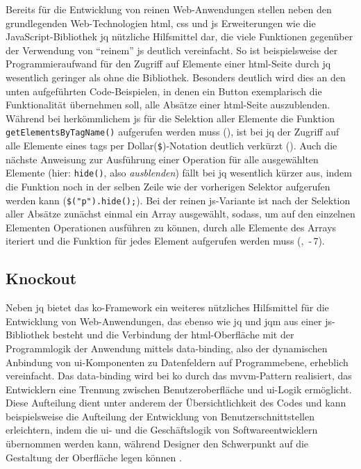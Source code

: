 Bereits für die Entwicklung von reinen Web-Anwendungen stellen neben den grundlegenden Web-Technologien \gls{html}, \gls{css} und \gls{js} Erweiterungen wie die JavaScript-Bibliothek \gls{jq} nützliche Hilfsmittel dar, die viele Funktionen gegenüber der Verwendung von \enquote{reinem} \gls{js} deutlich vereinfacht.
So ist beispielsweise der Programmieraufwand für den Zugriff auf Elemente einer \gls{html}-Seite durch \gls{jq} wesentlich geringer als ohne die Bibliothek.
Besonders deutlich wird dies an den unten aufgeführten Code-Beispielen, in denen ein Button exemplarisch die Funktionalität übernehmen soll, alle Absätze einer \gls{html}-Seite auszublenden.
Während bei herkömmlichem \gls{js} für die Selektion aller Elemente die Funktion \lstinline|getElementsByTagName()| aufgerufen werden muss (), ist bei \gls{jq} der Zugriff auf alle Elemente eines \glspl{tag} per Dollar(\lstinline|$|)-Notation deutlich verkürzt ().
Auch die nächste Anweisung zur Ausführung einer Operation für alle ausgewählten Elemente (hier: \lstinline|hide()|, also \textit{ausblenden}) fällt bei \gls{jq} wesentlich kürzer aus, indem die Funktion noch in der selben Zeile wie der vorherigen Selektor aufgerufen werden kann (\lstinline|$("p").hide();|).
Bei der reinen \gls{js}-Variante ist nach der Selektion aller Absätze zunächst einmal ein Array ausgewählt, sodass, um auf den einzelnen Elementen Operationen ausführen zu können, durch alle Elemente des Arrays iteriert und die Funktion für jedes Element aufgerufen werden muss (, \,-\,7).


	
\subsection{Knockout}  \label{ko}

Neben \gls{jq} bietet das \gls{ko}-Framework ein weiteres nützliches Hilfsmittel für die Entwicklung von Web-Anwendungen, das ebenso wie \gls{jq} und \gls{jqm} aus einer \gls{js}-Bibliothek besteht und die Verbindung der \gls{html}-Oberfläche mit der Programmlogik der Anwendung mittels \gls{data-binding}, also der dynamischen Anbindung von \gls{ui}-Komponenten zu Datenfeldern auf Programmebene, erheblich vereinfacht.
Das \gls{data-binding} wird bei \gls{ko} durch das \gls{mvvm}-Pattern realisiert, das Entwicklern eine Trennung zwischen Benutzeroberfläche und \gls{ui}-Logik ermöglicht.
Diese Aufteilung dient unter anderem der Übersichtlichkeit des Codes und kann beispielsweise die Aufteilung der Entwicklung von Benutzerschnittstellen erleichtern, indem die \gls{ui}- und die Geschäftslogik von Softwareentwicklern übernommen werden kann, während Designer den Schwerpunkt auf die Gestaltung der Oberfläche legen können \cite{Model_View_ViewModel__Wikipedia}.

